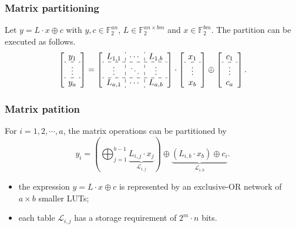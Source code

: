 \documentclass{beamer}
\begin{document}
\frame
{
\frametitle{Matrix partitioning}
Let $y = L \cdot x \oplus c$ with $y, c \in \mathbb{F}^{an}_{2}$, $L \in \mathbb{F}^{an\times bm}_{2}$ and $x \in \mathbb{F}^{bm}_{2}$. The partition can be executed as follows.
\[
    \begin{bmatrix} %
    \begin{array}{c}
      y_{1}  \\ 
      \hdashline
      \vdots \\
      \hdashline
      y_{a} \\
      \end{array}
   \end{bmatrix} = 
   \begin{bmatrix}%
   \begin{array}{c : c : c}
      L_{1, 1} & \cdots & L_{1, b}  \\ 
      \hdashline
      \vdots & \ddots & \vdots \\
      \hdashline
      L_{a, 1} & \cdots & L_{a, b} \\
      \end{array}
   \end{bmatrix} 
   \cdot 
   \begin{bmatrix}%
   \begin{array}{c}
   x_{1} \\
   \hdashline
   \vdots \\
   x_{b} \\
   \end{array}
   \end{bmatrix}
   \oplus
      \begin{bmatrix}%
   \begin{array}{c}
   c_{1} \\
   \hdashline
   \vdots \\
   c_{a} \\
   \end{array}
   \end{bmatrix}
.\]

}

\frame
{
\frametitle{Matrix patition}
For $i = 1, 2, \cdots, a$, the matrix operations can be partitioned by
\[ y_{i} = (\bigoplus^{b-1}_{j=1} \underbrace{L_{i,j} \cdot x_{j}}_{\mathcal{L}_{i,j}}) \oplus \underbrace{(L_{i, b} \cdot x_{b}) \oplus c_{i}}_{\mathcal{L}_{i,b}}.\]

\begin{itemize}
\item the expression $y=L\cdot x \oplus c$ is represented by an exclusive-OR network of $a\times b$ smaller LUTs;

\item each table $\mathcal{L}_{i,j}$ has a storage requirement of $2^{m}\cdot n$ bits.
\end{itemize}
}
\end{document}
